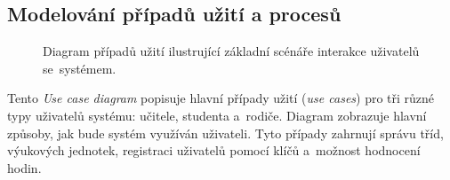 \documentclass[male,czech,api_bc]{kitheses}
\begin{document}
\subsection{Modelování případů užití a procesů}

\begin{figure}[H]
	\centering
	\caption{Diagram případů užití ilustrující základní scénáře interakce uživatelů se~systémem.}
	\label{fig:use-case-diagram}
\end{figure}

Tento \textit{Use case diagram} popisuje hlavní případy užití (\textit{use cases}) pro tři různé typy uživatelů systému: učitele, studenta a~rodiče. Diagram zobrazuje hlavní způsoby, jak bude systém využíván uživateli. Tyto případy zahrnují správu tříd, výukových jednotek, registraci uživatelů pomocí klíčů a~možnost hodnocení hodin.
\end{document}
